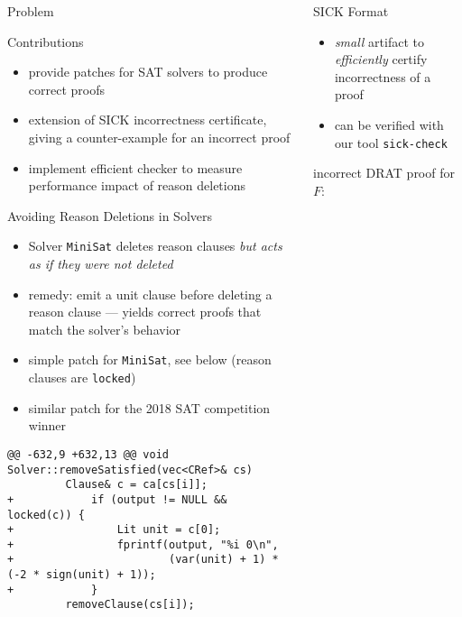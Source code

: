 \documentclass[final,hyperref={pdfpagelabels=true}]{beamer}
\begin{document}
\begin{frame}[fragile]
\begin{columns}[t]
\begin{column}{.45\textwidth}
\begin{block}{Problem}
    \end{block}

    \begin{block}{Contributions}
        \begin{itemize}
		\item provide patches for SAT solvers to produce correct proofs
		\item extension of SICK incorrectness certificate, giving
		a counter-example for an incorrect proof
		\item implement efficient checker to measure performance
		impact of reason deletions
        \end{itemize}
    \end{block}


    \begin{block}{Avoiding Reason Deletions in Solvers}
	\begin{itemize}
	    \item Solver \texttt{MiniSat} deletes reason clauses \emph{but
	    acts as if they were not deleted}
            \item remedy: emit a unit clause before deleting a reason clause
            --- yields correct proofs that match the solver's behavior
            \item simple patch for \texttt{MiniSat}, see below (reason
            clauses are \texttt{locked})
            \item similar patch for the 2018 SAT competition winner
	\end{itemize}
	\vspace{0.5cm}
        {\footnotesize
            \begin{verbatim}
@@ -632,9 +632,13 @@ void Solver::removeSatisfied(vec<CRef>& cs)
         Clause& c = ca[cs[i]];
+            if (output != NULL && locked(c)) {
+                Lit unit = c[0];
+                fprintf(output, "%i 0\n",
+                        (var(unit) + 1) * (-2 * sign(unit) + 1));
+            }
         removeClause(cs[i]);
            \end{verbatim}
        }
    \end{block}
    \end{column}

    \begin{column}{.45\textwidth}
    \begin{block}{SICK Format}
        \begin{itemize}
            \item \emph{small} artifact to \emph{efficiently} certify
            incorrectness of a proof
            \item can be verified with our tool \texttt{sick-check}
        \end{itemize}
        \vspace{.5cm}
        incorrect DRAT proof for $F$:


\end{block}
\end{column}
\end{columns}
\end{frame}
\end{document}
